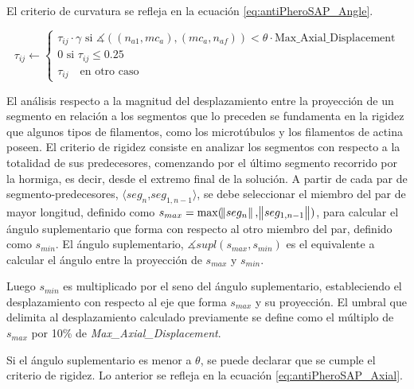 El criterio de curvatura se refleja en la ecuaci\'on \eqref{eq:antiPheroSAP_Angle}.

\begin{equation}
    \tau_{ij} \leftarrow
        \begin{cases}
        \tau_{ij} \cdot \gamma \text{ si } \measuredangle((n_{a1}, mc_{a}), (mc_{a}, n_{af})) < \theta \cdot \text{Max\_Axial\_Displacement}\\[3ex]
        
        \text{0 si } \tau_{ij} \leq 0.25 \\[3ex]
        \tau_{ij} \quad \text{en otro caso}
        \end{cases}
    \label{eq:antiPheroSAP_Angle}
\end{equation}

El an\'alisis respecto a la magnitud del desplazamiento entre la proyecci\'on de un segmento en relaci\'on a los segmentos que lo preceden se fundamenta en la rigidez que algunos tipos de filamentos, como los microt\'ubulos y los filamentos de actina poseen\cite{stam2017filament}. El criterio de rigidez consiste en analizar los segmentos con respecto a la totalidad de sus predecesores, comenzando por el \'ultimo segmento recorrido por la hormiga, es decir, desde el extremo final de la soluci\'on. A partir de cada par de segmento-predecesores, $\langle seg_{n}$,$seg_{1,n-1}\rangle$, se debe seleccionar el miembro del par de mayor longitud, definido como $s_{max} = \max(\norm{seg_{n}}, \norm{seg_{1,n-1}})$, para calcular el \'angulo suplementario que forma con respecto al otro miembro del par, definido como $s_{min}$. El \'angulo suplementario, $\measuredangle supl(s_{max},s_{min})$ es el equivalente a calcular el \'angulo entre la proyecci\'on de $s_{max}$ y $s_{min}$.

Luego $s_{min}$ es multiplicado por el seno del \'angulo suplementario, estableciendo el desplazamiento con respecto al eje que forma $s_{max}$ y su proyecci\'on. El umbral que delimita al desplazamiento calculado previamente se define como el m\'ultiplo de $s_{max}$ por 10\% de {\it Max\_Axial\_Displacement}. 

Si el \'angulo suplementario es menor a $\theta$, se puede declarar que se cumple el criterio de rigidez. Lo anterior se refleja en la ecuaci\'on \eqref{eq:antiPheroSAP_Axial}. 



